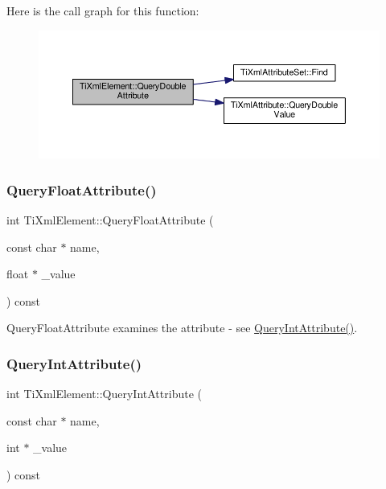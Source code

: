 Here is the call graph for this function\+:
\nopagebreak
\begin{figure}[H]
\begin{center}
\leavevmode
\includegraphics[width=350pt]{class_ti_xml_element_ae04bad29ddb281a7e6c662b3882e9928_cgraph}
\end{center}
\end{figure}
\mbox{\label{class_ti_xml_element_a5591929834178699b4561ab6ab460068}} 
\subsubsection{\texorpdfstring{Query\+Float\+Attribute()}{QueryFloatAttribute()}}
{\footnotesize\ttfamily int Ti\+Xml\+Element\+::\+Query\+Float\+Attribute (\begin{DoxyParamCaption}\item[{const char $\ast$}]{name,  }\item[{float $\ast$}]{\+\_\+value }\end{DoxyParamCaption}) const\hspace{0.3cm}{\ttfamily [inline]}}



Query\+Float\+Attribute examines the attribute -\/ see \hyperlink{class_ti_xml_element_a5c0f739e0f6f5905a201364532e54a60}{Query\+Int\+Attribute()}. 

\mbox{\label{class_ti_xml_element_a5c0f739e0f6f5905a201364532e54a60}} 
\subsubsection{\texorpdfstring{Query\+Int\+Attribute()}{QueryIntAttribute()}}
{\footnotesize\ttfamily int Ti\+Xml\+Element\+::\+Query\+Int\+Attribute (\begin{DoxyParamCaption}\item[{const char $\ast$}]{name,  }\item[{int $\ast$}]{\+\_\+value }\end{DoxyParamCaption}) const}

